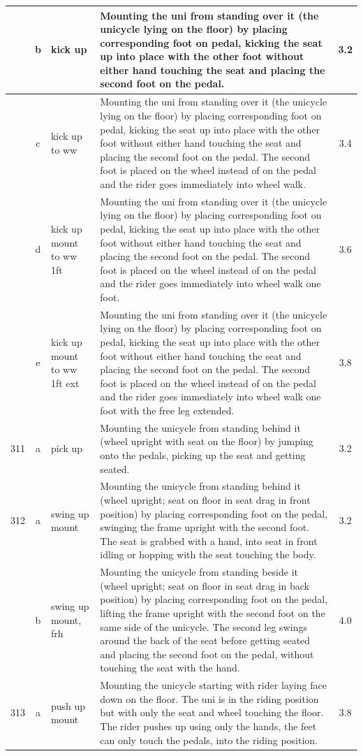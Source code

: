 \begin{longtable}{|r|c|p{4cm}|p{8cm}|c|}
\hline
  & b & kick up & Mounting the uni from standing over it (the unicycle lying on the floor) by placing corresponding foot on pedal, kicking the seat up into place with the other foot without either hand touching the seat and placing the second foot on the pedal. & 3.2 \\ 
\hline
  & c & kick up to ww & Mounting the uni from standing over it (the unicycle lying on the floor) by placing corresponding foot on pedal, kicking the seat up into place with the other foot without either hand touching the seat and placing the second foot on the pedal. The second foot is placed on the wheel instead of on the pedal and the rider goes immediately into wheel walk.  & 3.4 \\ 
\hline
  & d & kick up mount to ww 1ft & Mounting the uni from standing over it (the unicycle lying on the floor) by placing corresponding foot on pedal, kicking the seat up into place with the other foot without either hand touching the seat and placing the second foot on the pedal. The second foot is placed on the wheel instead of on the pedal and the rider goes immediately into wheel walk one foot. & 3.6 \\ 
\hline
  & e & kick up mount to ww 1ft ext & Mounting the uni from standing over it (the unicycle lying on the floor) by placing corresponding foot on pedal, kicking the seat up into place with the other foot without either hand touching the seat and placing the second foot on the pedal. The second foot is placed on the wheel instead of on the pedal and the rider goes immediately into wheel walk one foot with the free leg extended.  & 3.8 \\ 
\hline
311 & a & pick up & Mounting the unicycle from standing behind it (wheel upright with seat on the floor) by jumping onto the pedals, picking up the seat and getting seated.  & 3.2 \\ 
\hline
312 & a & swing up mount  & Mounting the unicycle from standing behind it (wheel upright; seat on floor in seat drag in front position) by placing corresponding foot on the pedal, swinging the frame upright with the second foot. The seat is grabbed with a hand, into seat in front idling or hopping with the seat touching the body. & 3.2 \\ 
\hline
  & b & swing up mount, frh & Mounting the unicycle from standing beside it (wheel upright; seat on floor in seat drag in back position) by placing corresponding foot on the pedal, lifting the frame upright with the second foot on the same side of the unicycle. The second leg swings around the back of the seat before getting seated and placing the second foot on the pedal, without touching the seat with the hand.  & 4.0 \\ 
\hline
313 & a & push up mount & Mounting the unicycle starting with rider laying face down on the floor. The uni is in the riding position but with only the seat and wheel touching the floor. The rider pushes up using only the hands, the feet can only touch the pedals, into the riding position. & 3.8 \\ 
\hline
\end{longtable}

